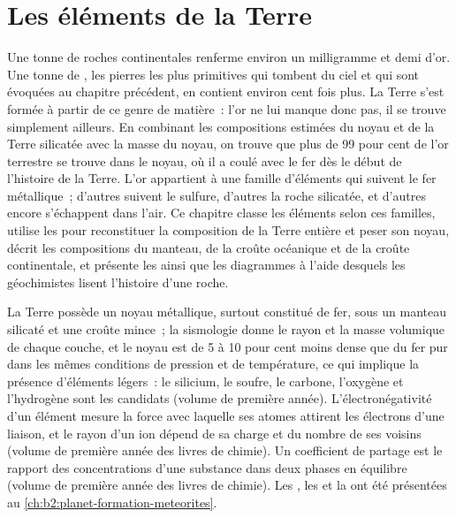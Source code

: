 \chapter{Les éléments de la Terre}\label{ch:b2:elements-in-the-earth}

Une tonne de roches continentales renferme environ un milligramme et demi d'or. Une
tonne de , les pierres les plus primitives qui tombent du
ciel et qui sont évoquées au chapitre précédent, en contient environ cent fois plus.
La Terre s'est formée à partir de ce genre de matière~: l'or ne lui manque donc
pas, il se trouve simplement ailleurs. En combinant les compositions estimées du
noyau et de la Terre silicatée avec la masse du noyau, on trouve que plus de 99 pour
cent de l'or terrestre se trouve dans le noyau, où il a coulé avec le fer dès
le début de l'histoire de la Terre. L'or appartient à une famille d'éléments qui
suivent le fer métallique~; d'autres suivent le sulfure, d'autres la roche silicatée,
et d'autres encore s'échappent dans l'air. Ce chapitre classe les éléments selon
ces familles, utilise les  pour reconstituer la composition de la Terre
entière et peser son noyau, décrit les compositions du manteau, de la croûte
océanique et de la croûte continentale, et présente les  ainsi que
les diagrammes à l'aide desquels les géochimistes lisent l'histoire d'une roche.

\begin{recall}
La Terre possède un noyau métallique, surtout constitué de fer, sous un manteau
silicaté et une croûte mince~; la sismologie donne le rayon et la masse volumique de
chaque couche, et le noyau est de 5 à 10 pour cent moins dense que du fer pur
dans les mêmes conditions de pression et de température, ce qui implique la présence
d'éléments légers~: le silicium, le soufre, le carbone, l'oxygène et l'hydrogène
sont les candidats (volume de première année). L'électronégativité d'un élément
mesure la force avec laquelle ses atomes attirent les électrons d'une liaison, et
le rayon d'un ion dépend de sa charge et du nombre de ses voisins (volume de
première année des livres de chimie). Un coefficient de partage est le rapport des
concentrations d'une substance dans deux phases en équilibre (volume de première
année des livres de chimie). Les , les  et la  ont été présentées au \cref{ch:b2:planet-formation-meteorites}.
\end{recall}

